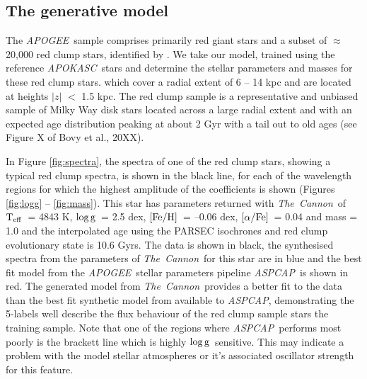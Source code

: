 \documentclass[12pt, preprint]{aastex}
\newcommand{\project}[1]{\textsl{#1}}
\newcommand{\tc}{\project{The~Cannon}}
\newcommand{\apogee}{\project{APOGEE}}
\newcommand{\apokasc}{\project{APOKASC}}
\newcommand{\aspcap}{\project{ASPCAP}}
\newcommand{\teff}{\mbox{$\rm T_{eff}$}}
\newcommand{\feh}{\mbox{$\rm [Fe/H]$}}
\newcommand{\alphafe}{\mbox{$\rm [\alpha/Fe]$}}
\newcommand{\logg}{\mbox{$\rm \log g$}}
\begin{document}
\subsection{The generative model}

The \apogee\ sample comprises primarily red giant stars and a subset of  $\approx$ 20,000 red clump stars, identified by \citet{Bovy2014}. We take our model, trained using the reference \apokasc\ stars and determine the stellar parameters and masses for these red clump stars. which cover a radial extent of 6 -- 14 kpc and are located at heights $|z|$ $<$ 1.5 kpc. The red clump sample is a representative and unbiased sample of Milky Way disk stars located across a large radial extent and with an expected age distribution peaking at about 2 Gyr with a tail out to old ages (see Figure X of Bovy et al., 20XX). 


In Figure \ref{fig:spectra}, the spectra of one of the red clump stars, showing a typical red clump spectra, is shown in the black line, for each of the wavelength regions for which the highest amplitude of the coefficients is shown (Figures \ref{fig:logg} -- \ref{fig:mass}).  This star has parameters returned with \tc\ of \teff\ = 4843 K, \logg\ = 2.5 dex, \feh\ = --0.06 dex, \alphafe\ = 0.04 and mass = 1.0 and the interpolated age using the PARSEC isochrones and red clump evolutionary state is 10.6 Gyrs. The data is shown in black, the synthesised spectra from the parameters of \tc\ for this star are in blue and the best fit model from the \apogee\ stellar parameters pipeline \aspcap\ is shown in red. The generated model from \tc\ provides a better fit to the data than the best fit synthetic model from available to \aspcap, demonstrating the 5-labels well describe the flux behaviour of the red clump sample stars the training sample. Note that one of the regions where \aspcap\ performs most poorly is the brackett line which is highly \logg\ sensitive. This may indicate a problem with the model stellar atmospheres or it's associated oscillator strength for this feature. 

\end{document}
